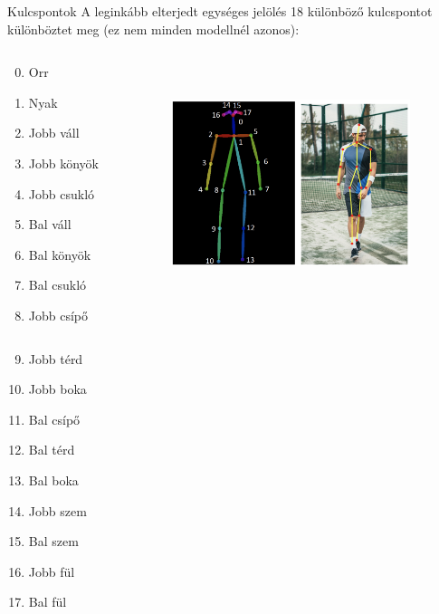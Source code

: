 \documentclass[english, aspectratio=169]{beamer}
\begin{document}
\begin{frame}{Kulcspontok}
A leginkább elterjedt egységes jelölés 18 különböző kulcspontot különböztet meg (ez nem minden modellnél azonos): 
\begin{columns}
\begin{column}{.5\textwidth}
\begin{column}{.5\textwidth}
\begin{enumerate}
	\setcounter{enumi}{-1}
	\item Orr
	\item Nyak
	\item Jobb váll
	\item Jobb könyök
	\item Jobb csukló
	\item Bal váll
	\item Bal könyök
	\item Bal csukló
	\item Jobb csípő
\end{enumerate}
\end{column}
\begin{column}{.5\textwidth}
\begin{enumerate}
	\setcounter{enumi}{8}
	\item Jobb térd
	\item Jobb boka
	\item Bal csípő
	\item Bal térd
	\item Bal boka
	\item Jobb szem
	\item Bal szem
	\item Jobb fül
	\item Bal fül
\end{enumerate}
\end{column}
\end{column}
\begin{column}{.5\textwidth}
\begin{center}
\includegraphics[height=7cm, width=7cm, keepaspectratio]{images/instance_23.png}
\end{center}
\end{column}
\end{columns}
\end{frame}
\end{document}
